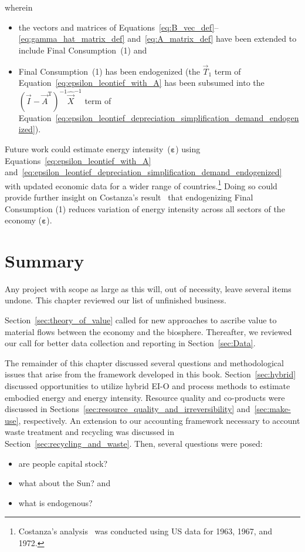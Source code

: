 \noindent{}wherein 

\begin{itemize}
	\item{the vectors and matrices of Equations~\ref{eq:B_vec_def}--\ref{eq:gamma_hat_matrix_def}
	and~\ref{eq:A_matrix_def} have been extended to include Final Consumption~(1) and}
	
	\item{Final Consumption~(1) has been endogenized
	(the $\vec{T}_{1}$ term of Equation~\ref{eq:epsilon_leontief_with_A}
	has been subsumed into the 
	${(\vec{I} - \vec{A}^{\mathrm{T}})}^{-1}\hat{\vec{X}}^{-1}$
	term of Equation~\ref{eq:epsilon_leontief_depreciation_simplification_demand_endogenized}).}
\end{itemize}

Future work could estimate energy intensity~($\boldsymbol{\varepsilon}$) 
using Equations~\ref{eq:epsilon_leontief_with_A}
and~\ref{eq:epsilon_leontief_depreciation_simplification_demand_endogenized}
with updated economic data for a wider range of countries.\footnote{Costanza's
analysis~\cite{Costanza:1980ww} was conducted using US data for 1963, 1967, and 1972.}
Doing so could provide further insight on Costanza's result~\cite{Costanza:1980ww}
that endogenizing Final Consumption (1) reduces variation 
of energy intensity across all sectors of the economy ($\boldsymbol{\varepsilon}$).


\section{Summary}
\label{sec:unfinished_summary}

Any project with scope as large as this will, out of necessity, leave
several items undone.
This chapter reviewed our list of unfinished business.

Section~\ref{sec:theory_of_value} called for new approaches
to ascribe value to material flows between the economy and the biosphere.
Thereafter, we reviewed our call for better data collection and reporting
in Section~\ref{sec:Data}.

The remainder of this chapter discussed several questions
and methodological issues that arise from the framework
developed in this book.
Section~\ref{sec:hybrid} discussed opportunities to utilize hybrid EI-O and process methods
to estimate embodied energy and energy intensity.
Resource quality and co-products were discussed 
in Sections~\ref{sec:resource_quality_and_irreversibility}
and~\ref{sec:make-use}, respectively.
An extension to our accounting framework necessary to account
waste treatment and recycling was discussed in Section~\ref{sec:recycling_and_waste}.
Then, several questions were posed:
\begin{itemize}
	\item{are people capital stock?}
	
	\item{what about the Sun? and}
	
	\item{what is endogenous?}
\end{itemize}

